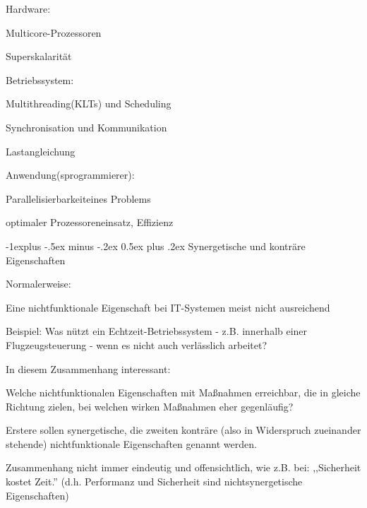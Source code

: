 \documentclass[a4paper]{article}
\makeatletter
\renewcommand{\subsection}{\@startsection{subsection}{2}{0mm}%
 {-1explus -.5ex minus -.2ex}%
 {0.5ex plus .2ex}%
 {\normalfont\normalsize\bfseries}}
\makeatother
\begin{document}
\begin{multicols}{3}
    \begin{itemize*}
        \item
        Hardware:
        \begin{itemize*}
            \item Multicore-Prozessoren
            \item Superskalarität
        \end{itemize*}
        \item
        Betriebssystem:
        \begin{itemize*}
            \item Multithreading(KLTs) und Scheduling
            \item Synchronisation und Kommunikation
            \item Lastangleichung
        \end{itemize*}
        \item
        Anwendung(sprogrammierer):
        \begin{itemize*}
            \item Parallelisierbarkeiteines Problems
            \item optimaler Prozessoreneinsatz, Effizienz
        \end{itemize*}
    \end{itemize*}


    \subsection{Synergetische und konträre
        Eigenschaften}

    \begin{itemize*}
        \item
        Normalerweise:
        \begin{itemize*}
            \item Eine nichtfunktionale Eigenschaft bei IT-Systemen meist nicht ausreichend
            \item Beispiel: Was nützt ein Echtzeit-Betriebssystem - z.B. innerhalb einer Flugzeugsteuerung - wenn es nicht auch verlässlich arbeitet?
        \end{itemize*}
        \item
        In diesem Zusammenhang interessant:
        \begin{itemize*}
            \item Welche nichtfunktionalen Eigenschaften mit Maßnahmen erreichbar, die in gleiche Richtung zielen, bei welchen wirken Maßnahmen eher gegenläufig?
            \item Erstere sollen synergetische, die zweiten konträre (also in Widerspruch zueinander stehende) nichtfunktionale Eigenschaften genannt werden.
            \item Zusammenhang nicht immer eindeutig und offensichtlich, wie z.B. bei: ,,Sicherheit kostet Zeit.'' (d.h. Performanz und Sicherheit sind nichtsynergetische Eigenschaften)
        \end{itemize*}
    \end{itemize*}



\end{multicols}
\end{document}

